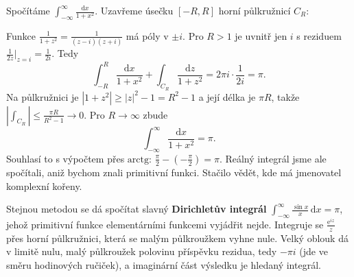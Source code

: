 \begin{example}
  Spočítáme $\int_{-\infty}^{\infty}\frac{\mathrm{d}x}{1 + x^2}$. Uzavřeme úsečku $[-R, R]$ horní půlkružnicí $C_R$:

  \begin{center}
  \end{center}

  Funkce $\frac{1}{1 + z^2} = \frac{1}{(z - i)(z + i)}$ má póly v $\pm i$. Pro $R > 1$ je uvnitř jen $i$ s reziduem $\frac{1}{2z}\big|_{z = i} = \frac{1}{2i}$. Tedy
  \begin{equation*}
    \int_{-R}^{R}\frac{\mathrm{d}x}{1 + x^2} + \int_{C_R}\frac{\mathrm{d}z}{1 + z^2} = 2\pi i\cdot\frac{1}{2i} = \pi.
  \end{equation*}
  Na půlkružnici je $|1 + z^2|\geq|z|^2 - 1 = R^2 - 1$ a její délka je $\pi R$, takže $\left|\int_{C_R}\right|\leq\frac{\pi R}{R^2 - 1}\to 0$. Pro $R\to\infty$ zbude
  \begin{equation*}
    \int_{-\infty}^{\infty}\frac{\mathrm{d}x}{1 + x^2} = \pi.
  \end{equation*}
  Souhlasí to s výpočtem přes $\mathrm{arctg}$: $\frac{\pi}{2} - \left(-\frac{\pi}{2}\right) = \pi$. Reálný integrál jsme ale spočítali, aniž bychom znali primitivní funkci. Stačilo vědět, kde má jmenovatel komplexní kořeny.
\end{example}

Stejnou metodou se dá spočítat slavný \textbf{Dirichletův integrál} $\int_{-\infty}^{\infty}\frac{\sin x}{x}\,\mathrm{d}x = \pi$, jehož primitivní funkce elementárními funkcemi vyjádřit nejde. Integruje se $\frac{\mathrm{e}^{iz}}{z}$ přes horní půlkružnici, která se malým půlkroužkem vyhne nule. Velký oblouk dá v limitě nulu, malý půlkroužek polovinu příspěvku rezidua, tedy $-\pi i$ (jde ve směru hodinových ručiček), a imaginární část výsledku je hledaný integrál.

